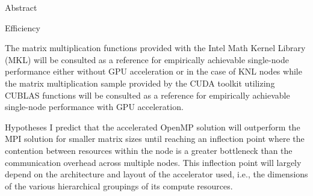 \documentclass{article}
\begin{document}
\begin{section}{Abstract}
\begin{subsection}{Efficiency}
\begin{paragraph}{}
    \end{paragraph}
    \begin{paragraph}{}
      The matrix multiplication functions provided with the Intel Math Kernel Library (MKL) will be consulted as a reference for empirically
      achievable single-node performance either without GPU acceleration or in the case of KNL nodes while the matrix multiplication sample provided
      by the CUDA toolkit utilizing CUBLAS functions will be consulted as a reference for empirically achievable single-node performance
      with GPU acceleration.
    \end{paragraph}
  \end{subsection}
  \begin{subsection}{Hypotheses}
    I predict that the accelerated OpenMP solution will outperform the MPI solution for smaller matrix sizes until
    reaching an inflection point where the contention between resources within the node is a greater bottleneck than
    the communication overhead across multiple nodes. This inflection point will largely depend on the architecture
    and layout of the accelerator used, i.e., the dimensions of the various hierarchical groupings of its compute resources.
  \end{subsection}
\end{section}
\end{document}
